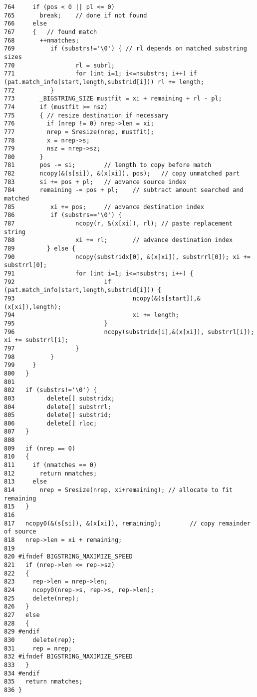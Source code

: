 \begin{verbatim}
764     if (pos < 0 || pl <= 0)
765       break;    // done if not found
766     else
767     {   // found match
768       ++nmatches;
769          if (substrs!='\0') { // rl depends on matched substring sizes
770                 rl = subrl;
771                 for (int i=1; i<=nsubstrs; i++) if (pat.match_info(start,length,substrid[i])) rl += length;
772          }
773       _BIGSTRING_SIZE mustfit = xi + remaining + rl - pl;
774       if (mustfit >= nsz)
775       { // resize destination if necessary
776         if (nrep != 0) nrep->len = xi;
777         nrep = Sresize(nrep, mustfit);
778         x = nrep->s;
779         nsz = nrep->sz;
780       }
781       pos -= si;        // length to copy before match
782       ncopy(&(s[si]), &(x[xi]), pos);   // copy unmatched part
783       si += pos + pl;   // advance source index
784       remaining -= pos + pl;    // subtract amount searched and matched
785          xi += pos;     // advance destination index
786          if (substrs=='\0') {
787                 ncopy(r, &(x[xi]), rl); // paste replacement string
788                 xi += rl;       // advance destination index
789         } else {
790                 ncopy(substridx[0], &(x[xi]), substrrl[0]); xi += substrrl[0];
791                 for (int i=1; i<=nsubstrs; i++) {
792                         if (pat.match_info(start,length,substrid[i])) {
793                                 ncopy(&(s[start]),&(x[xi]),length);
794                                 xi += length;
795                         }
796                         ncopy(substridx[i],&(x[xi]), substrrl[i]); xi += substrrl[i];
797                 }
798          }
799     }
800   }
801 
802   if (substrs!='\0') {
803         delete[] substridx;
804         delete[] substrrl;
805         delete[] substrid;
806         delete[] rloc;
807   }
808 
809   if (nrep == 0)
810   {
811     if (nmatches == 0)
812       return nmatches;
813     else
814       nrep = Sresize(nrep, xi+remaining); // allocate to fit remaining
815   }
816 
817   ncopy0(&(s[si]), &(x[xi]), remaining);        // copy remainder of source
818   nrep->len = xi + remaining;
819 
820 #ifndef BIGSTRING_MAXIMIZE_SPEED
821   if (nrep->len <= rep->sz)
822   {
823     rep->len = nrep->len;
824     ncopy0(nrep->s, rep->s, rep->len);
825     delete(nrep);
826   }
827   else
828   {
829 #endif
830     delete(rep);
831     rep = nrep;
832 #ifndef BIGSTRING_MAXIMIZE_SPEED
833   }
834 #endif
835   return nmatches;
836 }
\end{verbatim}\normalsize 
{}
